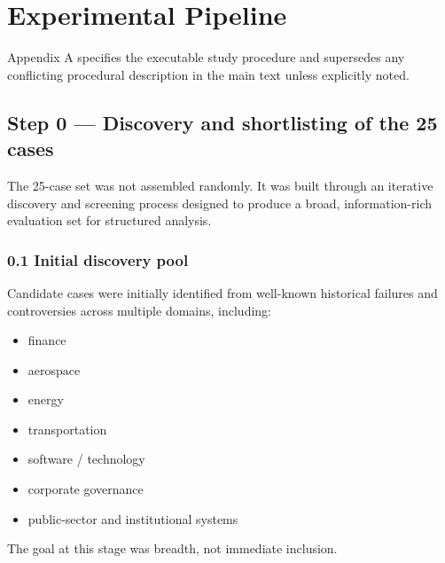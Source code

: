 \section{Experimental Pipeline}
\renewcommand{\appendixname}{}
Appendix A specifies the executable study procedure and supersedes any conflicting
procedural description in the main text unless explicitly noted.
\subsection*{Step 0 --- Discovery and shortlisting of the 25 cases}
The 25-case set was not assembled randomly. It was built through an iterative discovery and screening process
designed to produce a broad, information-rich evaluation set for structured analysis.

\subsubsection*{0.1 Initial discovery pool}
Candidate cases were initially identified from well-known historical failures and controversies across multiple
domains, including:
\begin{itemize}
  \item finance
  \item aerospace
  \item energy
  \item transportation
  \item software / technology
  \item corporate governance
  \item public-sector and institutional systems
\end{itemize}
The goal at this stage was breadth, not immediate inclusion.

